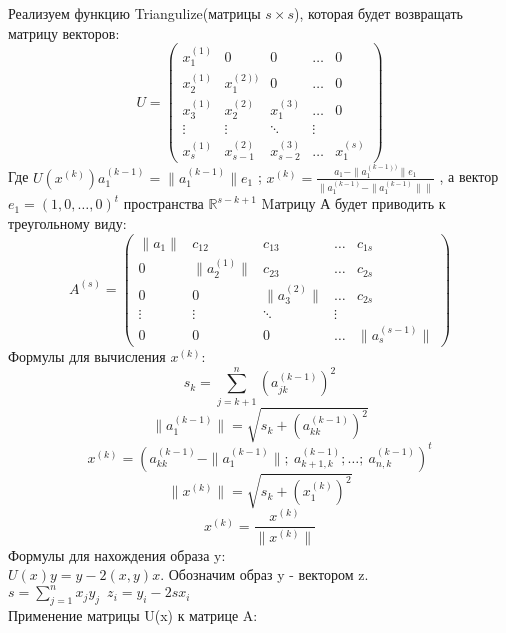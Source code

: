 \documentclass[a4paper,12pt]{article}
\begin{document}
Реализуем функцию Triangulize(матрицы $s\times s$), которая будет возвращать матрицу векторов:
\\                                                  
$$U=
   \begin{pmatrix}
     x_{1}^{(1)}& 0 & 0 & \ldots & 0\\
     x_{2}^{(1)}& x_{1}^{(2))} & 0 & \ldots & 0\\
     x_{3}^{(1)}& x_{2}^{(2)} & x_{1}^{(3)} & \ldots & 0\\
     \vdots& \vdots &\ddots & \vdots\\
     x_{s}^{(1)}& x_{s-1}^{(2)} & x_{s-2}^{(3)} &\ldots & x_{1}^{(s)}
    \end{pmatrix}
$$
Где $U(x^{(k)})a_{1}^{(k-1)} = \|a_{1}^{(k-1)}\|e_{1}$ ; $x^{(k)} = \frac{a_{1} - \|a_{1}^{(k-1))}\|e_{1}}{\|a_{1}^{(k-1)} - \|a_{1}^{(k-1)}\|\|}$ , а вектор $e_{1} = (1,0,\ldots  ,0)^{t}$ пространства $\mathbb{R}^{s-k+1}$  
Mатрицу А будет приводить к треугольному виду:
$$A^{(s)}=
   \begin{pmatrix}
     \|a_{1}\|& c_{12} &  c_{13} &\ldots & c_{1s}\\
     0& \|a_{2}^{(1)}\| &  c_{23} &\ldots & c_{2s}\\
     0& 0 & \|a_{3}^{(2)}\| &\ldots & c_{2s}\\
     \vdots& \vdots &\ddots & \vdots\\
    0& 0&  0 &\ldots &\|a_{s}^{(s-1)}\|
    \end{pmatrix}
$$
Формулы для вычисления $x^{(k)}$:
\\
\begin{equation}
    s_{k} = \sum\limits_{j = k+1}^n (a_{jk}^{(k-1)})^{2} 
\end{equation}
\begin{equation}
    \|a_{1}^{(k-1)}\| = \sqrt{s_{k} + (a_{kk}^{(k-1)})^{2}}
\end{equation}
\begin{equation}
x^{(k)} = (a_{kk}^{(k-1)} -  \|a_{1}^{(k-1)}\|;\ a_{k+1,k}^{(k-1)}; \ldots;\ a_{n,k}^{(k-1)})^{t}
\end{equation}
\begin{equation}
    \|x^{(k)}\| = \sqrt{s_{k} + (x_{1}^{(k)})^2}
\end{equation}
\begin{equation}
x^{(k)} = \frac{x^{(k)}}{\|x^{(k)}\|}
\end{equation}
Формулы для нахождения образа y: \\$U(x)y = y - 2(x,y)x$. Обозначим образ y - вектором z.\\
$s = \sum\limits_{j = 1}^n {x_{j}}{y_{j}} \;\ z_{i} = y_{i} - 2sx_{i} $\\
Применение матрицы U(x) к матрице A:\\
\end{document}
